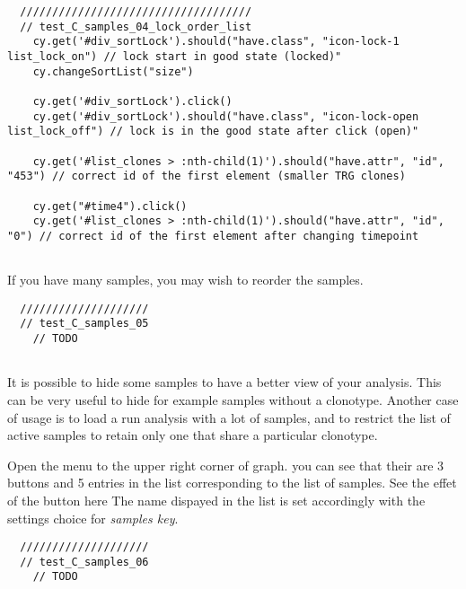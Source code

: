 \begin{verbatim}
  ////////////////////////////////////
  // test_C_samples_04_lock_order_list
    cy.get('#div_sortLock').should("have.class", "icon-lock-1 list_lock_on") // lock start in good state (locked)"
    cy.changeSortList("size")

    cy.get('#div_sortLock').click()
    cy.get('#div_sortLock').should("have.class", "icon-lock-open list_lock_off") // lock is in the good state after click (open)"

    cy.get('#list_clones > :nth-child(1)').should("have.attr", "id", "453") // correct id of the first element (smaller TRG clones)

    cy.get("#time4").click()
    cy.get('#list_clones > :nth-child(1)').should("have.attr", "id", "0") // correct id of the first element after changing timepoint


\end{verbatim}

\bigskip

If you have many samples, you may wish to reorder the samples.

\begin{verbatim}
  ////////////////////
  // test_C_samples_05
    // TODO


\end{verbatim}

It is possible to hide some samples to have a better view of your analysis. This can be very useful to hide for example samples without a clonotype.
Another case of usage is to load a run analysis with a lot of samples, and to restrict the list of active samples to retain only one that share a particular clonotype.

Open the menu to the upper right corner of graph. you can see that their are 3 buttons and 5 entries in the list corresponding to the list of samples.
See the effet of the button here
The name dispayed in the list is set accordingly with the settings choice for \textit{samples key}.
\begin{verbatim}
  ////////////////////
  // test_C_samples_06
    // TODO


\end{verbatim}

